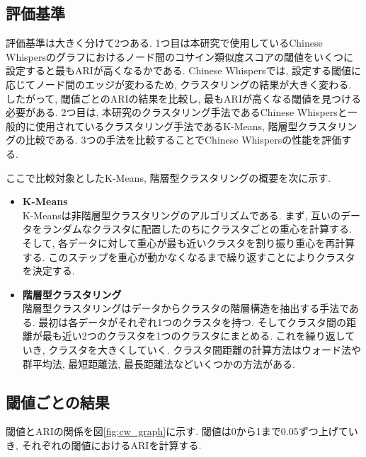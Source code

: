 \subsection{評価基準}
評価基準は大きく分けて2つある. 
1つ目は本研究で使用しているChinese Whispersのグラフにおけるノード間のコサイン類似度スコアの閾値をいくつに設定すると最もARIが高くなるかである. Chinese Whispersでは, 設定する閾値に応じてノード間のエッジが変わるため, クラスタリングの結果が大きく変わる. したがって, 閾値ごとのARIの結果を比較し, 最もARIが高くなる閾値を見つける必要がある. 
2つ目は, 本研究のクラスタリング手法であるChinese Whispersと一般的に使用されているクラスタリング手法であるK-Means, 階層型クラスタリングの比較である. 3つの手法を比較することでChinese Whispersの性能を評価する. 

ここで比較対象としたK-Means, 階層型クラスタリングの概要を次に示す. 

\begin{itemize}
  \item \textbf{K-Means}\\
  K-Meansは非階層型クラスタリングのアルゴリズムである. まず, 互いのデータをランダムなクラスタに配置したのちにクラスタごとの重心を計算する. そして, 各データに対して重心が最も近いクラスタを割り振り重心を再計算する. このステップを重心が動かなくなるまで繰り返すことによりクラスタを決定する. 

  \item \textbf{階層型クラスタリング}\\
  階層型クラスタリングはデータからクラスタの階層構造を抽出する手法である. 最初は各データがそれぞれ1つのクラスタを持つ. そしてクラスタ間の距離が最も近い2つのクラスタを1つのクラスタにまとめる. これを繰り返していき, クラスタを大きくしていく. クラスタ間距離の計算方法はウォード法や群平均法, 最短距離法, 最長距離法などいくつかの方法がある. 
\end{itemize}

\subsection{閾値ごとの結果}
閾値とARIの関係を図\ref{fig:cw_graph}に示す. 閾値は0から1まで0.05ずつ上げていき, それぞれの閾値におけるARIを計算する. 

